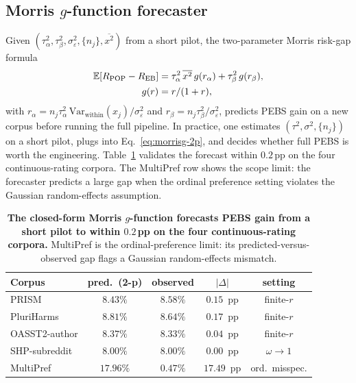\documentclass{article}
\newcommand{\PEBS}{\textsc{PEBS}}
\begin{document}
\subsection{Morris $g$-function forecaster}\label{sec:morrisg}
Given $(\tau^2_\alpha, \tau^2_\beta, \sigma^2_\varepsilon, \{n_j\},
\overline{x^2})$ from a short pilot, the two-parameter Morris risk-gap
formula
\begin{align}
  \mathbb E\!\left[R_{\text{POP}} - R_{\text{EB}}\right]
  &= \tau^2_\alpha\,\overline{x^2}\,g(r_\alpha) + \tau^2_\beta\,g(r_\beta), \notag \\
  g(r) &= r/(1+r),
  \label{eq:morrisg-2p}
\end{align}
with $r_\alpha = n_j\tau^2_\alpha\,\mathrm{Var}_{\text{within}}(x_j)/\sigma^2_\varepsilon$ and
$r_\beta = n_j\tau^2_\beta/\sigma^2_\varepsilon$,
predicts PEBS gain on a new corpus before running the full
pipeline. In practice, one estimates
$(\tau^2,\sigma^2,\{n_j\})$ on a short pilot, plugs into
Eq.~\ref{eq:morrisg-2p}, and decides whether full PEBS is worth
the engineering. Table~\ref{tab:morrisg-forecast} validates the
forecast within $0.2$\,pp on the four continuous-rating corpora.
The MultiPref row shows the scope limit: the forecaster predicts a
large gap when the ordinal preference setting violates the
Gaussian random-effects assumption.

\begin{table}[htbp]
\caption{\textbf{The closed-form Morris $g$-function forecasts
\PEBS{} gain from a short pilot to within $0.2$\,pp on the four
continuous-rating corpora.} MultiPref is the ordinal-preference
limit: its predicted-versus-observed gap flags a Gaussian
random-effects mismatch.}
\label{tab:morrisg-forecast}
\centering\scriptsize
\setlength{\tabcolsep}{2.5pt}
\begin{tabular}{lcccc}
\toprule
Corpus & pred.\ (2-p) & observed & $|\Delta|$ & setting \\
\midrule
PRISM             & $8.43\%$ & $8.58\%$ & $0.15$~pp & finite-$r$ \\
PluriHarms        & $8.81\%$ & $8.64\%$ & $0.17$~pp & finite-$r$ \\
OASST2-author     & $8.37\%$ & $8.33\%$ & $0.04$~pp & finite-$r$ \\
SHP-subreddit     & $8.00\%$ & $8.00\%$ & $0.00$~pp & $\omega\!\to\!1$ \\
MultiPref & $17.96\%$ & $0.47\%$ & $17.49$~pp & ord.\ misspec. \\
\bottomrule
\end{tabular}
\end{table}
\end{document}
